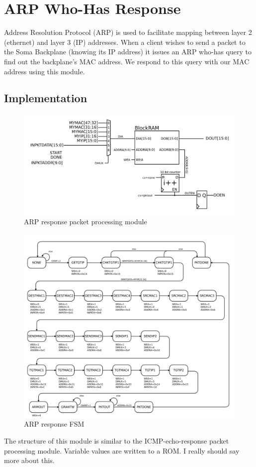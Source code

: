 \section{ARP Who-Has Response}

Address Resolution Protocol (ARP) is used to facilitate mapping
between layer 2 (ethernet) and layer 3 (IP) addresses. When a client
wishes to send a packet to the Soma Backplane (knowing its IP address)
it issues an ARP who-has query to find out the backplane's MAC
address. We respond to this query with our MAC address using this
module.

\subsection{Implementation}
\begin{figure}
\begin{centering}
\includegraphics[scale=0.8]{arpresponse.svg}
\end{centering}
\caption{ARP response packet processing module}
\label{arpresponse}
\end{figure}

\begin{figure}
\begin{centering}
\includegraphics[scale=0.8]{arpresponse.fsm.svg}
\end{centering}
\caption{ARP response FSM}
\label{arpresponse.fsm}
\end{figure}



The structure of this module is similar to the ICMP-echo-response
packet processing module. Variable values are written to a ROM. I
really should say more about this.
